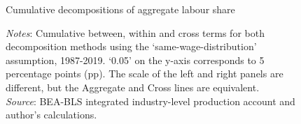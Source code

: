 {

\begin{figure}[h]
  \centering
\caption{\normalsize Cumulative decompositions of aggregate labour share}
\vfill
\begin{minipage}{\linewidth}
    \caption*{\textit{Notes}: Cumulative between, within and cross terms for both decomposition methods using the `same-wage-distribution' assumption, 1987-2019. `0.05' on the y-axis corresponds to 5 percentage points (pp). The scale of the left and right panels are different, but the Aggregate and Cross lines are equivalent. \\
    \textit{Source}: BEA-BLS integrated industry-level production account and author's calculations.}
\end{minipage}
\label{fig:decomp_2}
\end{figure}
}


